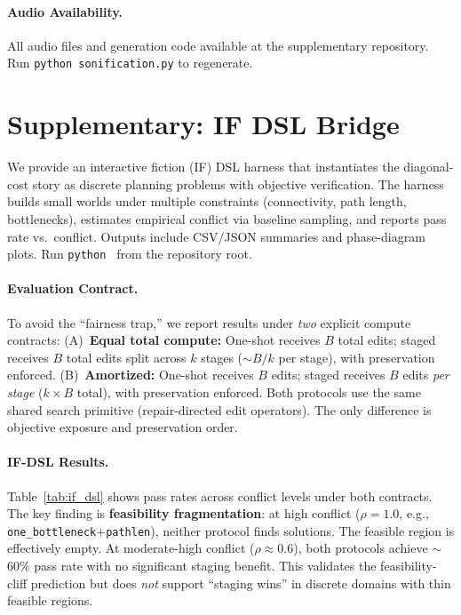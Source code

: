 \documentclass{article}
\theoremstyle{plain}
\theoremstyle{definition}
\theoremstyle{remark}
\begin{document}
\paragraph{Audio Availability.}
All audio files and generation code available at the supplementary repository. Run \texttt{python sonification.py} to regenerate.

\section{Supplementary: IF DSL Bridge}\label{app:if_dsl_bridge}

We provide an interactive fiction (IF) DSL harness that instantiates the diagonal-cost story as discrete planning problems with objective verification. The harness builds small worlds under multiple constraints (connectivity, path length, bottlenecks), estimates empirical conflict via baseline sampling, and reports pass rate vs.\ conflict. Outputs include CSV/JSON summaries and phase-diagram plots. Run \texttt{python }  from the repository root.

\paragraph{Evaluation Contract.}
To avoid the ``fairness trap,'' we report results under \emph{two} explicit compute contracts:
(A)~\textbf{Equal total compute:} One-shot receives $B$ total edits; staged receives $B$ total edits split across $k$ stages ($\sim B/k$ per stage), with preservation enforced.
(B)~\textbf{Amortized:} One-shot receives $B$ edits; staged receives $B$ edits \emph{per stage} ($k \times B$ total), with preservation enforced.
Both protocols use the same shared search primitive (repair-directed edit operators). The only difference is objective exposure and preservation order.

\paragraph{IF-DSL Results.}
Table~\ref{tab:if_dsl} shows pass rates across conflict levels under both contracts. The key finding is \textbf{feasibility fragmentation}: at high conflict ($\rho = 1.0$, e.g., \texttt{one\_bottleneck}$+$\texttt{pathlen}), neither protocol finds solutions. The feasible region is effectively empty. At moderate-high conflict ($\rho \approx 0.6$), both protocols achieve $\sim$60\% pass rate with no significant staging benefit. This validates the feasibility-cliff prediction but does \emph{not} support ``staging wins'' in discrete domains with thin feasible regions.
\end{document}
